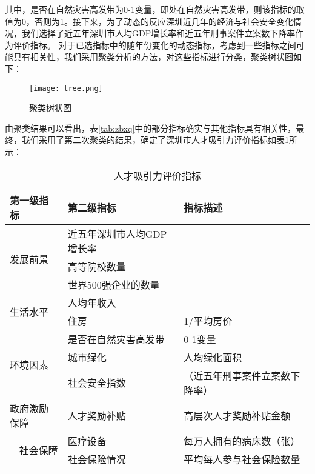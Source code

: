 \documentclass[withoutpreface,bwprint]{cumcmthesis} %
\begin{document}
\newpage
其中，是否在自然灾害高发带为0-1变量，即处在自然灾害高发带，则该指标的取值为0，否则为1。接下来，为了动态的反应深圳近几年的经济与社会安全变化情况，我们选择了近五年深圳市人均GDP增长率和近五年刑事案件立案数下降率作为评价指标。
对于已选指标中的随年份变化的动态指标，考虑到一些指标之间可能具有相关性，我们采用聚类分析的方法，对这些指标进行分类，聚类树状图如下：
\begin{figure}[!h]
\centering
\texttt{[image: tree.png]}
\caption{聚类树状图}
\label{聚类树状图}
\end{figure}

由聚类结果可以看出，表\ref{tab:zbxq}中的部分指标确实与其他指标具有相关性，最终，我们采用了第二次聚类的结果，确定了深圳市人才吸引力评价指标如表\ref{tab:人才吸引力评价指标}所示：
\begin{table}[htbp]
  \centering
  \caption{人才吸引力评价指标}
    \begin{tabular}{rp{12.665em}p{16.835em}}
    \toprule
    \multicolumn{1}{l}{第一级指标} & \multicolumn{1}{l}{第二级指标} & \multicolumn{1}{l}{指标描述} \\
    \midrule
    \multicolumn{1}{l}{\multirow{3}[6]{*}{发展前景}} & \multicolumn{1}{l}{近五年深圳市人均GDP增长率} & \multicolumn{1}{r}{} \\
\cmidrule{2-3}      & \multicolumn{1}{l}{高等院校数量} & \multicolumn{1}{r}{} \\
\cmidrule{2-3}      & \multicolumn{1}{l}{世界500强企业的数量} & \multicolumn{1}{r}{} \\
    \midrule
    \multicolumn{1}{l}{\multirow{2}[4]{*}{生活水平}} & \multicolumn{1}{l}{人均年收入} & \multicolumn{1}{r}{} \\
\cmidrule{2-3}      & \multicolumn{1}{l}{住房} & \multicolumn{1}{l}{1/平均房价 } \\
    \midrule
    \multicolumn{1}{l}{\multirow{3}[6]{*}{环境因素}} & \multicolumn{1}{l}{是否在自然灾害高发带} & \multicolumn{1}{l}{0-1变量 } \\
\cmidrule{2-3}      & \multicolumn{1}{l}{城市绿化} & \multicolumn{1}{l}{人均绿化面积 } \\
\cmidrule{2-3}      & \multicolumn{1}{l}{社会安全指数} & \multicolumn{1}{l}{（近五年刑事案件立案数下降率）} \\
    \midrule
    \multicolumn{1}{l}{政府激励保障} & 人才奖励补贴 & \multicolumn{1}{l}{高层次人才奖励补贴金额 } \\
    \midrule
    \multicolumn{1}{r}{\multirow{2}[4]{*}{社会保障}} & 医疗设备 & 每万人拥有的病床数（张） \\
\cmidrule{2-3}      & 社会保险情况 & 平均每人参与社会保险数量  \\
    \bottomrule
    \end{tabular}%
  \label{tab:人才吸引力评价指标}%
\end{table}%
\end{document}
